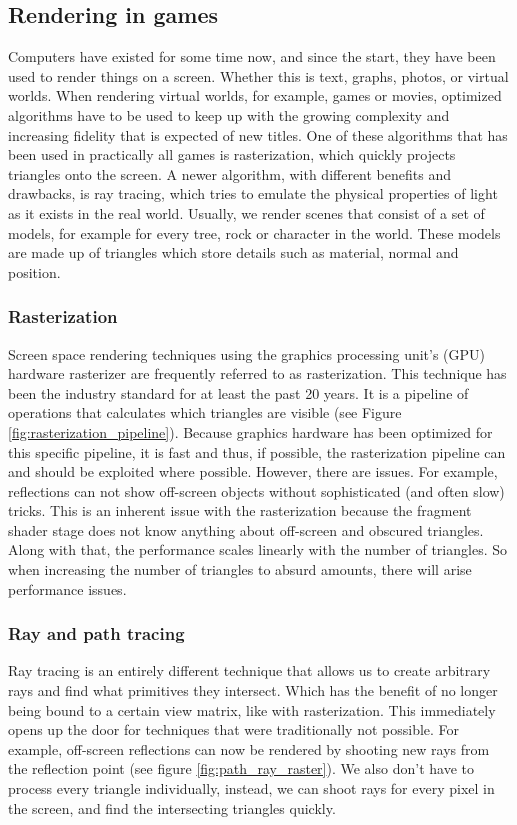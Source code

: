 \subsection{Rendering in games} \label{related_work:rendering}
Computers have existed for some time now, and since the start, they have been used to render things on a screen. Whether this is text, graphs, photos, or virtual worlds. When rendering virtual worlds, for example, games or movies, optimized algorithms have to be used to keep up with the growing complexity and increasing fidelity that is expected of new titles. One of these algorithms that has been used in practically all games is rasterization, which quickly projects triangles onto the screen. A newer algorithm, with different benefits and drawbacks, is ray tracing, which tries to emulate the physical properties of light as it exists in the real world. Usually, we render scenes that consist of a set of models, for example for every tree, rock or character in the world. These models are made up of triangles which store details such as material, normal and position.


\subsubsection{Rasterization} \label{related_work:rendering:rasterization}
Screen space rendering techniques using the graphics processing unit's (GPU) hardware rasterizer are frequently referred to as rasterization. This technique has been the industry standard for at least the past 20 years. It is a pipeline of operations that calculates which triangles are visible (see Figure \ref{fig:rasterization_pipeline}). Because graphics hardware has been optimized for this specific pipeline, it is fast and thus, if possible, the rasterization pipeline can and should be exploited where possible. However, there are issues. For example, reflections can not show off-screen objects without sophisticated (and often slow) tricks. This is an inherent issue with the rasterization because the fragment shader stage does not know anything about off-screen and obscured triangles. Along with that, the performance scales linearly with the number of triangles. So when increasing the number of triangles to absurd amounts, there will arise performance issues.

\subsubsection{Ray and path tracing} \label{related_work:rendering:ray_tracing}
Ray tracing is an entirely different technique that allows us to create arbitrary rays and find what primitives they intersect. Which has the benefit of no longer being bound to a certain view matrix, like with rasterization. This immediately opens up the door for techniques that were traditionally not possible. For example, off-screen reflections can now be rendered by shooting new rays from the reflection point (see figure \ref{fig:path_ray_raster}). We also don't have to process every triangle individually, instead, we can shoot rays for every pixel in the screen, and find the intersecting triangles quickly.

